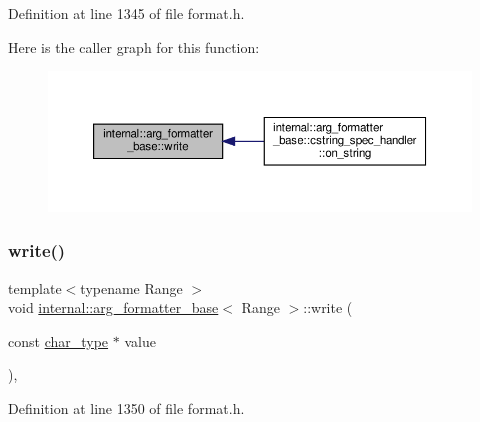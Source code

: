 Definition at line 1345 of file format.\+h.

Here is the caller graph for this function\+:
\nopagebreak
\begin{figure}[H]
\begin{center}
\leavevmode
\includegraphics[width=350pt]{classinternal_1_1arg__formatter__base_afec2f8db2cc820b66ae5065737cbda8a_icgraph}
\end{center}
\end{figure}
\mbox{\label{classinternal_1_1arg__formatter__base_ab31e5e8e9512fba38b91b53d530fbff0}} 
\subsubsection{\texorpdfstring{write()}{write()}\hspace{0.1cm}{\footnotesize\ttfamily [2/2]}}
{\footnotesize\ttfamily template$<$typename Range $>$ \\
void \hyperlink{classinternal_1_1arg__formatter__base}{internal\+::arg\+\_\+formatter\+\_\+base}$<$ Range $>$\+::write (\begin{DoxyParamCaption}\item[{const \hyperlink{classinternal_1_1arg__formatter__base_a407930bf282880d2ca45dfa8f5d2034b}{char\+\_\+type} $\ast$}]{value }\end{DoxyParamCaption})\hspace{0.3cm}{\ttfamily [inline]}, {\ttfamily [protected]}}



Definition at line 1350 of file format.\+h.

\mbox{\label{classinternal_1_1arg__formatter__base_ad58c7a9790ec2bf6ed16f2caa1aa3a1f}} 
